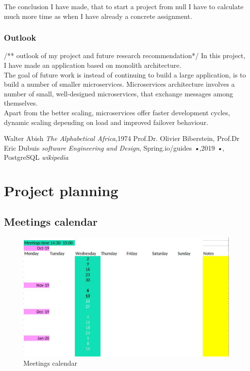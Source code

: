 \documentclass{scrartcl}
\begin{document}
The conclusion I have made, that to start a project from null I have to calculate much more time as when I have already a concrete assignment.
 

\subsubsection{Outlook}
/** outlook of my project and future research recommendation*/
In this project, I have made an application based on monolith architecture. \\
The goal of future work is instead of continuing to build a large application, is to build a number of smaller microservices. Microservices architecture involves a number of small, well-designed microservices, that exchange messages among themselves.\\
Apart from the better scaling, microservices offer faster development cycles, dynamic scaling depending on load and improved failover behaviour.\\






\printbibliography[heading=bibintoc]


\begin{thebibliography}{books}
Walter Abish \emph{The Alphabetical Africa},1974
 Prof.Dr. Olivier Biberstein, Prof.Dr Eric Dubuis \emph{software Engineering and Design},
Spring.io/guides \emph{•},2019
 \emph{•},
 PostgreSQL \emph{wikipedia}
\end{thebibliography}


\section{Project planning}
\subsection{Meetings calendar}

\begin{figure}[H]
\centering
\includegraphics[width = 130mm]{agenda.jpg}
\caption{Meetings calendar}
\label{calendar}
\end{figure}
\end{document}
